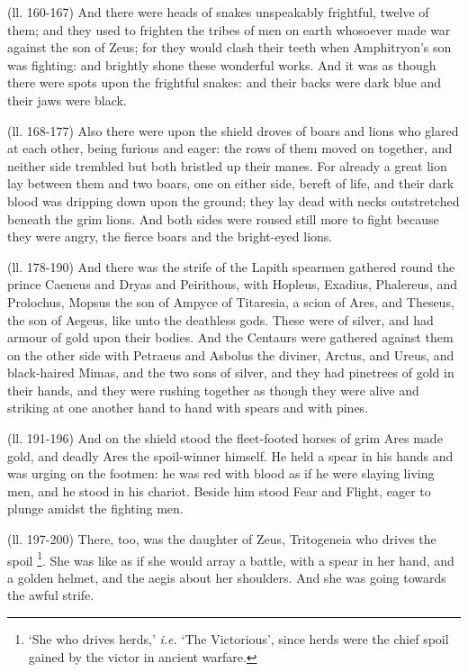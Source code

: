 (ll. 160-167) And there were heads of snakes unspeakably frightful, twelve of
them; and they used to frighten the tribes of men on earth whosoever made war
against the son of Zeus; for they would clash their teeth when
Amphitryon’s son was fighting: and brightly shone these wonderful works.
And it was as though there were spots upon the frightful snakes: and their
backs were dark blue and their jaws were black.

(ll. 168-177) Also there were upon the shield droves of boars and lions who
glared at each other, being furious and eager: the rows of them moved on
together, and neither side trembled but both bristled up their manes. For
already a great lion lay between them and two boars, one on either side, bereft
of life, and their dark blood was dripping down upon the ground; they lay dead
with necks outstretched beneath the grim lions. And both sides were roused
still more to fight because they were angry, the fierce boars and the
bright-eyed lions.

(ll. 178-190) And there was the strife of the Lapith spearmen gathered round
the prince Caeneus and Dryas and Peirithous, with Hopleus, Exadius, Phalereus,
and Prolochus, Mopsus the son of Ampyce of Titaresia, a scion of Ares, and
Theseus, the son of Aegeus, like unto the deathless gods. These were of silver,
and had armour of gold upon their bodies. And the Centaurs were gathered
against them on the other side with Petraeus and Asbolus the diviner, Arctus,
and Ureus, and black-haired Mimas, and the two sons of silver, and they had
pinetrees of gold in their hands, and they were rushing together as though they
were alive and striking at one another hand to hand with spears and with pines.

(ll. 191-196) And on the shield stood the fleet-footed horses of grim Ares made
gold, and deadly Ares the spoil-winner himself. He held a spear in his hands
and was urging on the footmen: he was red with blood as if he were slaying
living men, and he stood in his chariot. Beside him stood Fear and Flight,
eager to plunge amidst the fighting men.

(ll. 197-200) There, too, was the daughter of Zeus, Tritogeneia who drives the
spoil \footnote{‘She who drives
herds,’ \emph{i.e.} ‘The Victorious’, since herds were the
chief spoil gained by the victor in ancient warfare.}. She was like as if she would
array a battle, with a spear in her hand, and a golden helmet, and the aegis
about her shoulders. And she was going towards the awful strife.

